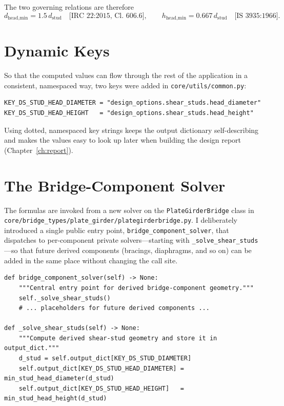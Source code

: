 \noindent The two governing relations are therefore
\[
  d_{\text{head,min}} = 1.5\,d_{\text{stud}} \quad\text{[IRC 22:2015, Cl.\ 606.6]},
  \qquad
  h_{\text{head,min}} = 0.667\,d_{\text{stud}} \quad\text{[IS 3935:1966]}.
\]

\section{Dynamic Keys}
So that the computed values can flow through the rest of the application in a consistent,
namespaced way, two keys were added in \texttt{core/utils/common.py}:

\begin{lstlisting}[caption={Namespaced keys for the derived stud geometry (\texttt{core/utils/common.py}).},label={lst:studkeys}]
KEY_DS_STUD_HEAD_DIAMETER = "design_options.shear_studs.head_diameter"
KEY_DS_STUD_HEAD_HEIGHT   = "design_options.shear_studs.head_height"
\end{lstlisting}

Using dotted, namespaced key strings keeps the output dictionary self-describing and makes the
values easy to look up later when building the design report (Chapter~\ref{ch:report}).

\section{The Bridge-Component Solver}
The formulas are invoked from a new solver on the \texttt{PlateGirderBridge} class in
\texttt{core/bridge\_types/plate\_girder/plategirderbridge.py}. I deliberately introduced a
single public entry point, \texttt{bridge\_component\_solver}, that dispatches to per-component
private solvers---starting with \texttt{\_solve\_shear\_studs}---so that future derived
components (bracings, diaphragms, and so on) can be added in the same place without changing the
call site.

\begin{lstlisting}[caption={Central solver dispatch and the shear-stud solver (\texttt{plategirderbridge.py}).},label={lst:solver}]
def bridge_component_solver(self) -> None:
    """Central entry point for derived bridge-component geometry."""
    self._solve_shear_studs()
    # ... placeholders for future derived components ...

def _solve_shear_studs(self) -> None:
    """Compute derived shear-stud geometry and store it in output_dict."""
    d_stud = self.output_dict[KEY_DS_STUD_DIAMETER]
    self.output_dict[KEY_DS_STUD_HEAD_DIAMETER] = min_stud_head_diameter(d_stud)
    self.output_dict[KEY_DS_STUD_HEAD_HEIGHT]   = min_stud_head_height(d_stud)
\end{lstlisting}


